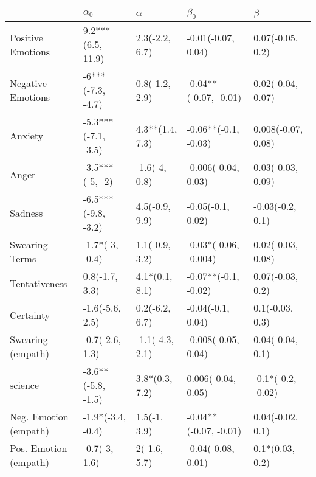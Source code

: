\begin{tabular}{lllll}
\toprule
{} &           $\alpha_0$ &         $\alpha$ &              $\beta_0$ &             $\beta$ \\
\midrule
Positive Emotions     &    9.2***(6.5, 11.9) &   2.3(-2.2, 6.7) &     -0.01(-0.07, 0.04) &    0.07(-0.05, 0.2) \\
Negative Emotions     &    -6***(-7.3, -4.7) &   0.8(-1.2, 2.9) &  -0.04**(-0.07, -0.01) &   0.02(-0.04, 0.07) \\
Anxiety               &  -5.3***(-7.1, -3.5) &  4.3**(1.4, 7.3) &   -0.06**(-0.1, -0.03) &  0.008(-0.07, 0.08) \\
Anger                 &      -3.5***(-5, -2) &    -1.6(-4, 0.8) &    -0.006(-0.04, 0.03) &   0.03(-0.03, 0.09) \\
Sadness               &  -6.5***(-9.8, -3.2) &   4.5(-0.9, 9.9) &      -0.05(-0.1, 0.02) &    -0.03(-0.2, 0.1) \\
Swearing Terms        &      -1.7*(-3, -0.4) &   1.1(-0.9, 3.2) &  -0.03*(-0.06, -0.004) &   0.02(-0.03, 0.08) \\
Tentativeness         &       0.8(-1.7, 3.3) &   4.1*(0.1, 8.1) &   -0.07**(-0.1, -0.02) &    0.07(-0.03, 0.2) \\
Certainty             &      -1.6(-5.6, 2.5) &   0.2(-6.2, 6.7) &      -0.04(-0.1, 0.04) &     0.1(-0.03, 0.3) \\
Swearing (empath)     &      -0.7(-2.6, 1.3) &  -1.1(-4.3, 2.1) &    -0.008(-0.05, 0.04) &    0.04(-0.04, 0.1) \\
science               &   -3.6**(-5.8, -1.5) &   3.8*(0.3, 7.2) &     0.006(-0.04, 0.05) &  -0.1*(-0.2, -0.02) \\
Neg. Emotion (empath) &    -1.9*(-3.4, -0.4) &     1.5(-1, 3.9) &  -0.04**(-0.07, -0.01) &    0.04(-0.02, 0.1) \\
Pos. Emotion (empath) &        -0.7(-3, 1.6) &     2(-1.6, 5.7) &     -0.04(-0.08, 0.01) &     0.1*(0.03, 0.2) \\
\bottomrule
\end{tabular}
